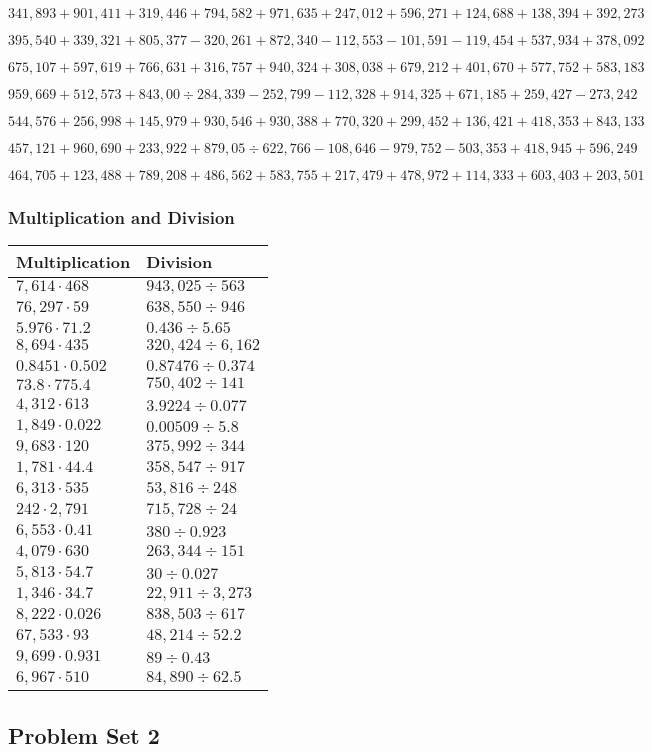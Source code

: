 \(341,893+901,411+319,446+794,582+971,635+247,012+596,271+124,688+138,394+392,273\)

\(395,540+339,321+805,377-320,261+872,340-112,553-101,591-119,454+537,934+378,092\)

\(675,107+597,619+766,631+316,757+940,324+308,038+679,212+401,670+577,752+583,183\)

\(959,669+512,573+843,00÷284,339-252,799-112,328+914,325+671,185+259,427-273,242\)

\(544,576+256,998+145,979+930,546+930,388+770,320+299,452+136,421+418,353+843,133\)

\(457,121+960,690+233,922+879,05÷622,766-108,646-979,752-503,353+418,945+596,249\)

\(464,705+123,488+789,208+486,562+583,755+217,479+478,972+114,333+603,403+203,501\)

\hypertarget{multiplication-and-division-305}{%
\subsubsection{Multiplication and
Division}\label{multiplication-and-division-305}}

\begin{longtable}[]{@{}ll@{}}
\toprule
Multiplication & Division\tabularnewline
\midrule
\endhead
\(7,614\cdot468\) & \(943,025÷563\)\tabularnewline
\(76,297\cdot59\) & \(638,550÷946\)\tabularnewline
\(5.976\cdot71.2\) & \(0.436÷5.65\)\tabularnewline
\(8,694\cdot435\) & \(320,424÷6,162\)\tabularnewline
\(0.8451\cdot0.502\) & \(0.87476÷0.374\)\tabularnewline
\(73.8\cdot775.4\) & \(750,402÷141\)\tabularnewline
\(4,312\cdot613\) & \(3.9224÷0.077\)\tabularnewline
\(1,849\cdot0.022\) & \(0.00509 ÷5.8\)\tabularnewline
\(9,683\cdot120\) & \(375,992÷344\)\tabularnewline
\(1,781\cdot44.4\) & \(358,547÷917\)\tabularnewline
\(6,313\cdot535\) & \(53,816÷248\)\tabularnewline
\(242\cdot2,791\) & \(715,728÷24\)\tabularnewline
\(6,553\cdot0.41\) & \(380÷0.923\)\tabularnewline
\(4,079\cdot630\) & \(263,344÷151\)\tabularnewline
\(5,813\cdot54.7\) & \(30÷0.027\)\tabularnewline
\(1,346\cdot34.7\) & \(22,911÷3,273\)\tabularnewline
\(8,222\cdot0.026\) & \(838,503÷617\)\tabularnewline
\(67,533\cdot93\) & \(48,214÷52.2\)\tabularnewline
\(9,699\cdot0.931\) & \(89÷0.43\)\tabularnewline
\(6,967\cdot510\) & \(84,890÷62.5\)\tabularnewline
\bottomrule
\end{longtable}

\hypertarget{problem-set-2-5}{%
\subsection{Problem Set 2}\label{problem-set-2-5}}

